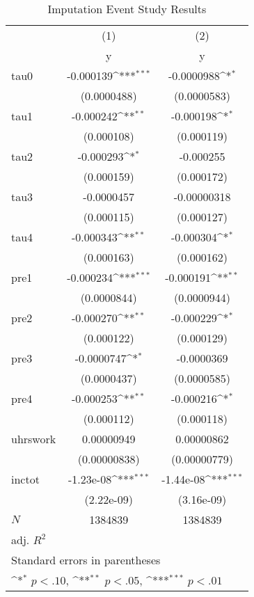 \begin{table}[htbp]\centering
\def\sym#1{\ifmmode^{#1}\else\(^{#1}\)\fi}
\caption{Imputation Event Study Results}
\begin{tabular}{l*{2}{c}}
\hline\hline
            &\multicolumn{1}{c}{(1)}&\multicolumn{1}{c}{(2)}\\
            &\multicolumn{1}{c}{y}&\multicolumn{1}{c}{y}\\
\hline
tau0        &   -0.000139\sym{***}&  -0.0000988\sym{*}  \\
            & (0.0000488)         & (0.0000583)         \\
[1em]
tau1        &   -0.000242\sym{**} &   -0.000198\sym{*}  \\
            &  (0.000108)         &  (0.000119)         \\
[1em]
tau2        &   -0.000293\sym{*}  &   -0.000255         \\
            &  (0.000159)         &  (0.000172)         \\
[1em]
tau3        &  -0.0000457         & -0.00000318         \\
            &  (0.000115)         &  (0.000127)         \\
[1em]
tau4        &   -0.000343\sym{**} &   -0.000304\sym{*}  \\
            &  (0.000163)         &  (0.000162)         \\
[1em]
pre1        &   -0.000234\sym{***}&   -0.000191\sym{**} \\
            & (0.0000844)         & (0.0000944)         \\
[1em]
pre2        &   -0.000270\sym{**} &   -0.000229\sym{*}  \\
            &  (0.000122)         &  (0.000129)         \\
[1em]
pre3        &  -0.0000747\sym{*}  &  -0.0000369         \\
            & (0.0000437)         & (0.0000585)         \\
[1em]
pre4        &   -0.000253\sym{**} &   -0.000216\sym{*}  \\
            &  (0.000112)         &  (0.000118)         \\
[1em]
uhrswork    &  0.00000949         &  0.00000862         \\
            &(0.00000838)         &(0.00000779)         \\
[1em]
inctot      &   -1.23e-08\sym{***}&   -1.44e-08\sym{***}\\
            &  (2.22e-09)         &  (3.16e-09)         \\
\hline
\(N\)       &     1384839         &     1384839         \\
adj. \(R^{2}\)&                     &                     \\
\hline\hline
\multicolumn{3}{l}{\footnotesize Standard errors in parentheses}\\
\multicolumn{3}{l}{\footnotesize \sym{*} \(p<.10\), \sym{**} \(p<.05\), \sym{***} \(p<.01\)}\\
\end{tabular}
\end{table}
